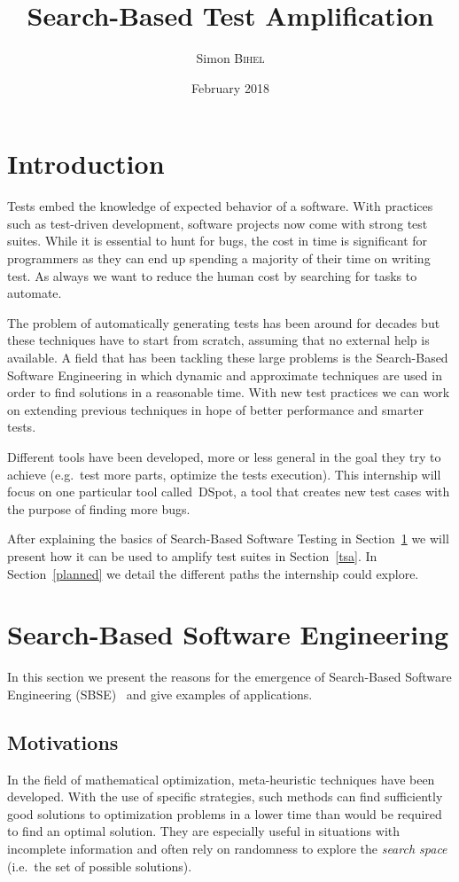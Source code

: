\documentclass[11pt]{sdm}
\title{Search-Based Test Amplification}
\author{Simon \textsc{Bihel}}
\date{February 2018}
\newcommand{\dspot}{DSpot\xspace}
\begin{document}
\maketitle

\section*{Introduction}
\label{intro}
Tests embed the knowledge of expected behavior of a software.
With practices such as test-driven development, software projects now come with strong test suites.
While it is essential to hunt for bugs, the cost in time is significant for programmers as they can end up spending a majority of their time on writing test.
As always we want to reduce the human cost by searching for tasks to automate.

The problem of automatically generating tests has been around for decades but these techniques have to start from scratch, assuming that no external help is available.
A field that has been tackling these large problems is the Search-Based Software Engineering in which dynamic and approximate techniques are used in order to find solutions in a reasonable time.
With new test practices we can work on extending previous techniques in hope of better performance and smarter tests.

Different tools have been developed, more or less general in the goal they try to achieve (e.g.\ test more parts, optimize the tests execution).
This internship will focus on one particular tool called~\dspot{}, a tool that creates new test cases with the purpose of finding more bugs.

After explaining the basics of Search-Based Software Testing in Section~\ref{sbse} we will present how it can be used to amplify test suites in Section~\ref{tsa}.
In Section~\ref{planned} we detail the different paths the internship could explore.


\section{Search-Based Software Engineering}
\label{sbse}

In this section we present the reasons for the emergence of Search-Based Software Engineering (SBSE)~\cite{harman2001search,mcminn2011search} and give examples of applications.

\subsection{Motivations}
\label{motiv}
In the field of mathematical optimization, meta-heuristic techniques have been developed.
With the use of specific strategies, such methods can find sufficiently good solutions to optimization problems in a lower time than would be required to find an optimal solution.
They are especially useful in situations with incomplete information and often rely on randomness to explore the \textit{search space} (i.e.\ the set of possible solutions).
\end{document}
